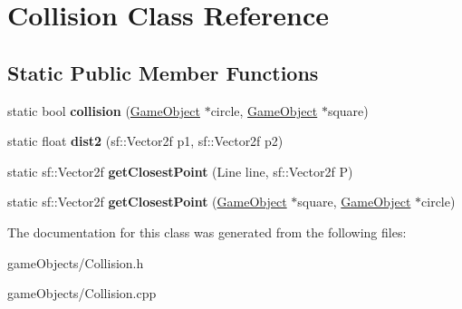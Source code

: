 \hypertarget{class_collision}{\section{Collision Class Reference}
\label{class_collision}
}
\subsection*{Static Public Member Functions}
\begin{DoxyCompactItemize}
\item 
\hypertarget{class_collision_a15e1a40debf5b3649a52acc6a66ba5f3}{static bool {\bfseries collision} (\hyperlink{class_game_object}{Game\+Object} $\ast$circle, \hyperlink{class_game_object}{Game\+Object} $\ast$square)}\label{class_collision_a15e1a40debf5b3649a52acc6a66ba5f3}

\item 
\hypertarget{class_collision_acc64e25069ade32fedd95facc8d9d5ff}{static float {\bfseries dist2} (sf\+::\+Vector2f p1, sf\+::\+Vector2f p2)}\label{class_collision_acc64e25069ade32fedd95facc8d9d5ff}

\item 
\hypertarget{class_collision_ac2abd6765b06f0b4ac4a4e8c64df91d1}{static sf\+::\+Vector2f {\bfseries get\+Closest\+Point} (Line line, sf\+::\+Vector2f P)}\label{class_collision_ac2abd6765b06f0b4ac4a4e8c64df91d1}

\item 
\hypertarget{class_collision_a673e7d6d943e407332745ec4ac510a0f}{static sf\+::\+Vector2f {\bfseries get\+Closest\+Point} (\hyperlink{class_game_object}{Game\+Object} $\ast$square, \hyperlink{class_game_object}{Game\+Object} $\ast$circle)}\label{class_collision_a673e7d6d943e407332745ec4ac510a0f}

\end{DoxyCompactItemize}


The documentation for this class was generated from the following files\+:\begin{DoxyCompactItemize}
\item 
game\+Objects/Collision.\+h\item 
game\+Objects/Collision.\+cpp\end{DoxyCompactItemize}
